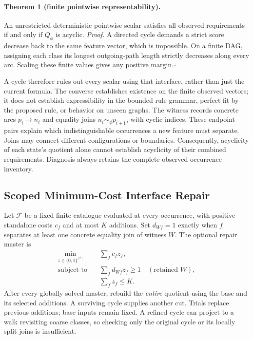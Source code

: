 \paragraph{Theorem 1 (finite pointwise representability).}
An unrestricted deterministic pointwise scalar satisfies all observed
requirements if and only if $Q_\phi$ is acyclic.
\emph{Proof.} A directed cycle demands a strict score decrease back to the
same feature vector, which is impossible. On a finite DAG, assigning each
class its longest outgoing-path length strictly decreases along every arc.
Scaling these finite values gives any positive margin.\hfill$\square$

A cycle therefore rules out every scalar using that interface, rather than
just the current formula. The converse establishes existence on the finite
observed vectors; it does not establish expressibility in the bounded rule
grammar, perfect fit by the proposed rule, or behavior on unseen graphs.
The witness records concrete arcs $p_i\to n_i$ and equality joins
$n_i\sim_\phi p_{i+1}$, with cyclic indices. These endpoint pairs explain
which indistinguishable occurrences a new feature must separate.
Joins may connect different configurations or boundaries. Consequently,
acyclicity of each state's quotient alone cannot establish acyclicity of
their combined requirements. Diagnosis always retains the complete observed
occurrence inventory.

\subsection{Scoped Minimum-Cost Interface Repair}
Let $\mathcal F$ be a fixed finite catalogue evaluated at every occurrence,
with positive standalone costs $c_f$ and at most $K$ additions. Set
$d_{Wf}=1$ exactly when $f$ separates at least one concrete equality join
of witness $W$. The optional repair master is
\begin{equation}
 \begin{split}
 \min_{z\in\{0,1\}^{|\mathcal F|}}\quad&\sum_f c_fz_f,\\
 \text{subject to}\quad&\sum_f d_{Wf}z_f\geq1\quad(\text{retained }W),\\
 &\sum_fz_f\leq K.
 \end{split}
 \label{eq:repair-cover}
\end{equation}
After every globally solved master, rebuild the \emph{entire} quotient using
the base and its selected additions. A surviving cycle supplies another cut.
Trials replace previous additions; base inputs remain fixed. A refined cycle
can project to a walk revisiting coarse classes, so checking only the original
cycle or its locally split joins is insufficient.

